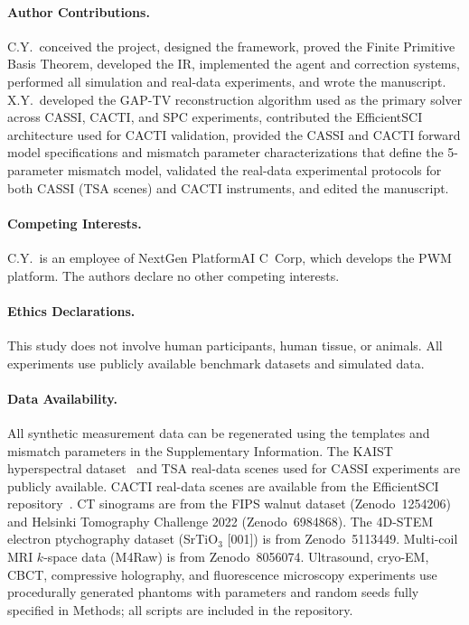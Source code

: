 \paragraph{Author Contributions.}
C.Y.\ conceived the project, designed the \triad{} framework, proved the Finite Primitive Basis Theorem, developed the \opg{} IR, implemented the agent and correction systems, performed all simulation and real-data experiments, and wrote the manuscript. X.Y.\ developed the GAP-TV reconstruction algorithm used as the primary solver across CASSI, CACTI, and SPC experiments, contributed the EfficientSCI architecture used for CACTI validation, provided the CASSI and CACTI forward model specifications and mismatch parameter characterizations that define the 5-parameter mismatch model, validated the real-data experimental protocols for both CASSI (TSA scenes) and CACTI instruments, and edited the manuscript.

\paragraph{Competing Interests.}
C.Y.\ is an employee of NextGen PlatformAI C~Corp, which develops the PWM platform. The authors declare no other competing interests.

\paragraph{Ethics Declarations.}
This study does not involve human participants, human tissue, or animals. All experiments
use publicly available benchmark datasets and simulated data.

\paragraph{Data Availability.}
All synthetic measurement data can be regenerated using the \opg{} templates and mismatch parameters in the Supplementary Information. The KAIST hyperspectral dataset~\cite{choi2017kaist} and TSA real-data scenes used for CASSI experiments are publicly available. CACTI real-data scenes are available from the EfficientSCI repository~\cite{wang2023efficientsci}. CT sinograms are from the FIPS walnut dataset (Zenodo~1254206) and Helsinki Tomography Challenge 2022 (Zenodo~6984868). The 4D-STEM electron ptychography dataset (SrTiO$_3$ [001]) is from Zenodo~5113449. Multi-coil MRI $k$-space data (M4Raw) is from Zenodo~8056074. Ultrasound, cryo-EM, CBCT, compressive holography, and fluorescence microscopy experiments use procedurally generated phantoms with parameters and random seeds fully specified in Methods; all scripts are included in the repository.

